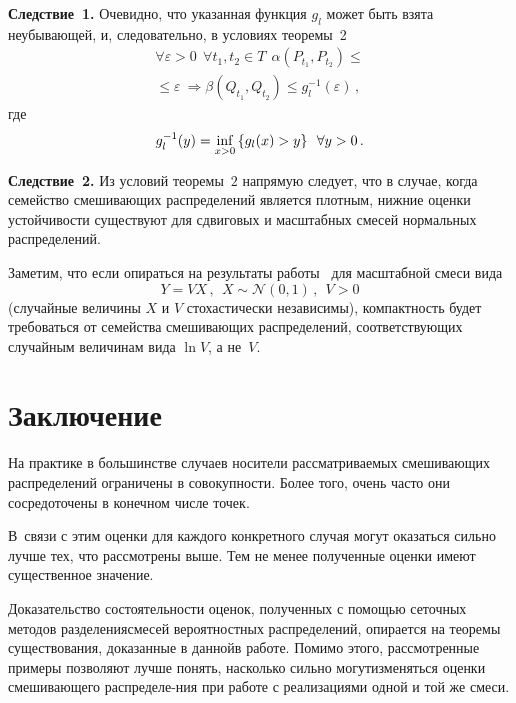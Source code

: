 \begin{multicols}{2}
\medskip

\noindent
\textbf{Следствие~1.}
Очевидно, что указанная функция $g_l$ может быть взята неубывающей,
и, следовательно, в условиях теоремы~2
\begin{multline*}
\forall \varepsilon > 0  \ \ \forall t_1, t_2 \in T \ \
\alpha(P_{t_1}, P_{t_2}) \le{}\\
{}\le \varepsilon  \  \Rightarrow
\beta(Q_{t_1}, Q_{t_2}) \le  g^{-1}_l(\varepsilon) \,,
\end{multline*}
где
$$
 g^{-1}_l(y) = \inf\limits_{
 x > 0 }\left\{
 g_l(x) > y
 \right\}  \enskip  \forall y >0\,.
$$


\noindent
\textbf{Следствие~2.}
Из условий теоремы~$2$ напрямую следует, что в случае, когда
семейство смешивающих распределений является плотным, нижние оценки
устойчивости существуют для сдвиговых и масштабных смесей нормальных
распределений.

\medskip

Заметим, что если опираться на результаты работы~\cite{NazStab} для
масштабной смеси вида
$$
Y=V X \,,\  \  X\sim\mathcal{N}(0,1)\,, \ \ V>0
$$
(случайные величины $X$ и  $V$ стохастически независимы),
компактность будет требоваться от семейства смешивающих
распределений, со\-от\-вет\-ст\-ву\-ющих  случайным величинам вида $\ln V$, а
не~$V$.

\section{Заключение}

На практике в большинстве случаев носители рассматриваемых
смешивающих распределений ограничены в совокупности. Более того,
очень час\-то  они сосредоточены в конечном числе точек. 

В~связи с
этим оценки для каждого конкретного случая могут оказаться сильно
лучше тех, что рассмотрены выше. Тем не менее полученные оценки
имеют существенное значение. 

 Доказательство состоятельности оценок,
полученных с помощью сеточных методов разделения\linebreak смесей
вероятностных распределений, опирается на  теоремы существования,
доказанные в данной\linebreak в работе. Помимо этого, рассмотренные примеры\linebreak
позволяют лучше  понять, насколько сильно могут\linebreak изменяться оценки
смешивающего распределе-\linebreak ния при работе с реализациями одной и той же\linebreak
смеси.




\end{multicols}
